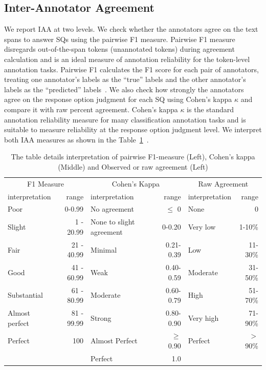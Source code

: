 \documentclass[sn-mathphys,Numbered]{sn-jnl}%
\theoremstyle{thmstyleone}%
\theoremstyle{thmstyletwo}%
\theoremstyle{thmstylethree}%
\begin{document}
\subsection{Inter-Annotator Agreement}
\label{method:iaa}
%
We report IAA at two levels. 
We check whether the annotators agree on the text spans to answer SQs using the pairwise F1 measure.
Pairwise F1 measure disregards out-of-the-span tokens (unannotated tokens) during agreement calculation and is an ideal measure of annotation reliability for the token-level annotation tasks.
Pairwise F1 calculates the F1 score for each pair of annotators, treating one annotator's labels as the ``true'' labels and the other annotator's labels as the ``predicted'' labels~\cite{deleger2012building,brandsen2020creating}.
We also check how strongly the annotators agree on the response option judgment for each SQ using Cohen's kappa $\kappa$ and compare it with raw percent agreement.
Cohen's kappa $\kappa$ is the standard annotation reliability measure for many classification annotation tasks and is suitable to measure reliability at the response option judgment level.
We interpret both IAA measures as shown in the Table~\ref{tab:iaa_interpret}~\cite{mchugh2012interrater,cohen1960coefficient,landis1977measurement}.
%
%
%
\begin{center}
 \begin{table}[htb]
   \caption{The table details interpretation of pairwise F1-measure (Left), Cohen's kappa (Middle) and Observed or raw agreement (Left)}\label{tab:iaa_interpret}
 \centering
    \begin{tabular}{lr|lr|lr}
    \toprule[1.0pt]
    \multicolumn{2}{c|}{F1 Measure} & \multicolumn{2}{c|}{Cohen's Kappa}& \multicolumn{2}{c}{Raw Agreement}  \\ 
    interpretation & range & interpretation & range & interpretation & range \\ 
    \midrule[1.0pt]
        Poor & 0-0.99 &  No agreement& $\leq$ 0 & None & 0 \\ 
        Slight & 1 - 20.99 &  None to slight agreement & 0-0.20 & Very low & 1-10\% \\ 
        Fair & 21 - 40.99 &  Minimal & 0.21-0.39 & Low & 11-30\% \\ 
        Good & 41 - 60.99 & Weak & 0.40-0.59 & Moderate & 31-50\% \\ 
        Substantial & 61 - 80.99 & Moderate & 0.60-0.79 & High & 51-70\% \\ 
        Almost perfect & 81 - 99.99 & Strong & 0.80-0.90 & Very high & 71-90\% \\ 
        Perfect & 100 & Almost Perfect & $\geq$ 0.90 & Perfect & $>$90\% \\ 
         & & Perfect & 1.0 \\ 
    \bottomrule[1.0pt]
    \end{tabular}
 \end{table}   
\end{center}
%
%
%
\end{document}
